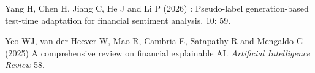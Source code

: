 \documentclass{aims}
\numberwithin{equation}{section}
\begin{document}
\begin{thebibliography}{}
\newblock Yang H, Chen H, Jiang C, He J and Li P (2026)
: Pseudo-label generation-based test-time adaptation for financial sentiment analysis.
 10: 59. 

\newblock Yeo WJ, van der Heever W, Mao R, Cambria E, Satapathy R and Mengaldo G (2025)
\newblock A comprehensive review on financial explainable {AI}. {\em Artificial Intelligence Review} 58.
\newblock  {}

\end{thebibliography}
\end{document}
